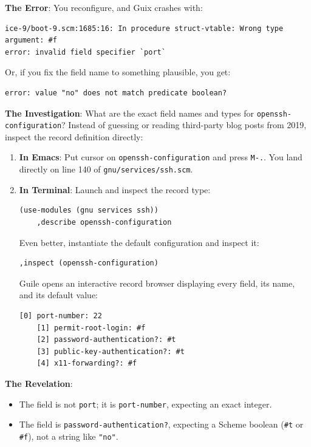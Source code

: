 \textbf{The Error}: You reconfigure, and Guix crashes with:
\begin{lstlisting}[style=guixcli]
ice-9/boot-9.scm:1685:16: In procedure struct-vtable: Wrong type argument: #f
error: invalid field specifier `port`
\end{lstlisting}
Or, if you fix the field name to something plausible, you get:
\begin{lstlisting}[style=guixcli]
error: value "no" does not match predicate boolean?
\end{lstlisting}

\textbf{The Investigation}: What are the exact field names and types for \texttt{openssh-configuration}?
Instead of guessing or reading third-party blog posts from 2019, inspect the record definition directly:

\begin{enumerate}
  \item \textbf{In Emacs}: Put cursor on \texttt{openssh-configuration} and press \texttt{M-.}. You land directly on line 140 of \texttt{gnu/services/ssh.scm}.
  \item \textbf{In Terminal}: Launch  and inspect the record type:
    \begin{lstlisting}[style=guixscheme]
    (use-modules (gnu services ssh))
    ,describe openssh-configuration
    \end{lstlisting}
    Even better, instantiate the default configuration and inspect it:
    \begin{lstlisting}[style=guixscheme]
    ,inspect (openssh-configuration)
    \end{lstlisting}
    Guile opens an interactive record browser displaying every field, its name, and its default value:
    \begin{lstlisting}[style=guixcli]
    [0] port-number: 22
    [1] permit-root-login: #f
    [2] password-authentication?: #t
    [3] public-key-authentication?: #t
    [4] x11-forwarding?: #f
    \end{lstlisting}
\end{enumerate}

\textbf{The Revelation}:
\begin{itemize}
  \item The field is not \texttt{port}; it is \texttt{port-number}, expecting an exact integer.
  \item The field is \texttt{password-authentication?}, expecting a Scheme boolean (\texttt{\#t} or \texttt{\#f}), not a string like \texttt{"no"}.
\end{itemize}

